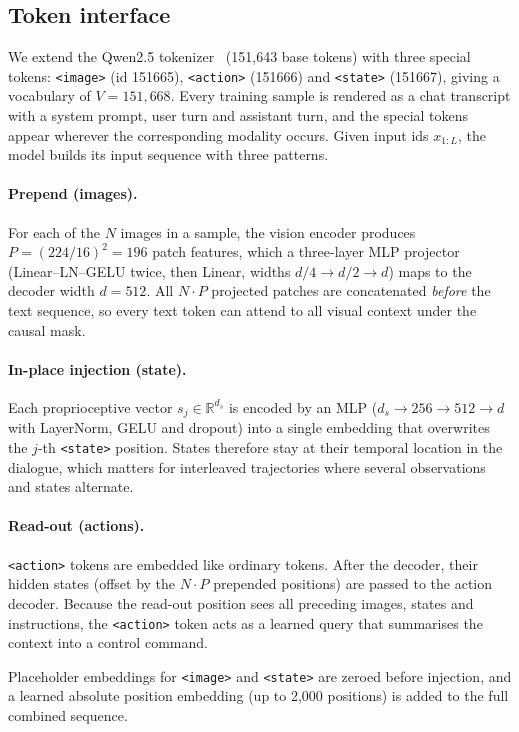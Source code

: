 \documentclass[11pt]{article}
\newcommand{\tok}[1]{\texttt{<#1>}}
\begin{document}
\subsection{Token interface}
\label{sec:tokens}

We extend the Qwen2.5 tokenizer~\cite{qwen2025qwen25} (151{,}643 base tokens) with three
special tokens: \tok{image} (id 151665), \tok{action} (151666) and \tok{state} (151667),
giving a vocabulary of $V=151{,}668$. Every training sample is rendered as a chat transcript
with a system prompt, user turn and assistant turn, and the special tokens appear wherever
the corresponding modality occurs. Given input ids $x_{1:L}$, the model builds its input
sequence with three patterns.

\paragraph{Prepend (images).} For each of the $N$ images in a sample, the vision encoder
produces $P=(224/16)^2=196$ patch features, which a three-layer MLP projector
(Linear--LN--GELU twice, then Linear, widths $d/4 \to d/2 \to d$) maps to the decoder width
$d=512$. All $N\cdot P$ projected patches are concatenated \emph{before} the text sequence,
so every text token can attend to all visual context under the causal mask.

\paragraph{In-place injection (state).} Each proprioceptive vector $s_j\in\mathbb{R}^{d_s}$
is encoded by an MLP ($d_s\to256\to512\to d$ with LayerNorm, GELU and dropout) into a single
embedding that overwrites the $j$-th \tok{state} position. States therefore stay at their
temporal location in the dialogue, which matters for interleaved trajectories where several
observations and states alternate.

\paragraph{Read-out (actions).} \tok{action} tokens are embedded like ordinary tokens. After
the decoder, their hidden states (offset by the $N\cdot P$ prepended positions) are passed to
the action decoder. Because the read-out position sees all preceding images, states and
instructions, the \tok{action} token acts as a learned query that summarises the context
into a control command.

Placeholder embeddings for \tok{image} and \tok{state} are zeroed before injection, and a
learned absolute position embedding (up to 2{,}000 positions) is added to the full combined
sequence.
\end{document}
